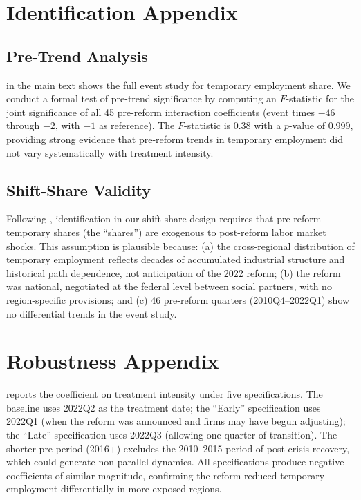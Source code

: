 \documentclass[12pt]{article}
\begin{document}
\section{Identification Appendix}
\label{sec:app_id}

\subsection{Pre-Trend Analysis}

 in the main text shows the full event study for temporary employment share. We conduct a formal test of pre-trend significance by computing an $F$-statistic for the joint significance of all 45 pre-reform interaction coefficients (event times $-46$ through $-2$, with $-1$ as reference). The $F$-statistic is 0.38 with a $p$-value of 0.999, providing strong evidence that pre-reform trends in temporary employment did not vary systematically with treatment intensity.

\subsection{Shift-Share Validity}

Following \citet{goldsmith2020bartik}, identification in our shift-share design requires that pre-reform temporary shares (the ``shares'') are exogenous to post-reform labor market shocks. This assumption is plausible because: (a) the cross-regional distribution of temporary employment reflects decades of accumulated industrial structure and historical path dependence, not anticipation of the 2022 reform; (b) the reform was national, negotiated at the federal level between social partners, with no region-specific provisions; and (c) 46 pre-reform quarters (2010Q4--2022Q1) show no differential trends in the event study.


\section{Robustness Appendix}
\label{sec:app_robust}



 reports the coefficient on treatment intensity under five specifications. The baseline uses 2022Q2 as the treatment date; the ``Early'' specification uses 2022Q1 (when the reform was announced and firms may have begun adjusting); the ``Late'' specification uses 2022Q3 (allowing one quarter of transition). The shorter pre-period (2016+) excludes the 2010--2015 period of post-crisis recovery, which could generate non-parallel dynamics. All specifications produce negative coefficients of similar magnitude, confirming the reform reduced temporary employment differentially in more-exposed regions.
\end{document}
